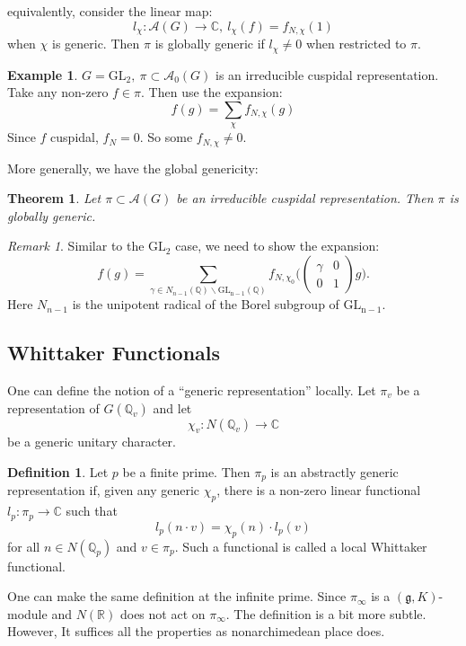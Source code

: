 \documentclass[11pt,english]{smfart}
\newtheorem{theorem}{Theorem}
\theoremstyle{definition}
\newtheorem{definition}{Definition}
\newtheorem{example}{Example}
\theoremstyle{remark}
\newtheorem*{remark}{Remark}
\begin{document}
equivalently, consider the linear map:
\[l_\chi :\mathcal{A}(G) \rightarrow \mathbb{C},\ l_\chi (f) =f_{N,\chi} (1)\]
when $\chi$ is generic. Then $\pi$ is globally generic if $l_\chi\neq 0$ when restricted to $\pi$.
\begin{example}
$G=\mathrm{GL_2},\ \pi \subset \mathcal{A}_0(G)$ is an irreducible cuspidal representation. Take any non-zero $f\in \pi$. Then use the expansion:
\[f(g) =\sum_{\chi} f_{N,\chi} (g)\]
Since $f$ cuspidal, $f_N=0.$ So some $f_{N,\chi}\neq 0.$
\end{example}
More generally, we have the global genericity:
\begin{theorem}
Let $\pi \subset \mathcal{A}(G)$ be an irreducible cuspidal representation. Then $\pi$ is globally generic.
\end{theorem}
\begin{remark}
Similar to the $\mathrm{GL_2}$ case, we need to show the expansion:
\[f(g) = \sum_{\gamma \in N_{n-1}(\mathbb{Q}) \backslash \mathrm{GL_{n-1}} (\mathbb{Q})} f_{N,\chi_0} \biggl(\left(\begin{array}{ll}
    \gamma & 0 \\
    0 & 1
    \end{array}\right)g\biggr).\]
    Here $N_{n-1}$ is the unipotent radical of the Borel
    subgroup of $\mathrm{GL_{n-1}}$.
\end{remark}
\subsection{Whittaker Functionals}
One can define the notion of a ``generic representation'' locally. Let $\pi_v$ be a representation of $G(\mathbb{Q}_v)$ and let
\[\chi_v: N(\mathbb{Q}_v) \rightarrow \mathbb{C}\]
be a generic unitary character.
\begin{definition}
Let $ p $ be a finite prime. Then $\pi_{p} $ is an abstractly generic representation if, given any generic $ \chi_{p} $,
there is a non-zero linear functional $ l_{p}: \pi_{p} \rightarrow \mathbb{C}$ such that
\[l_{p}(n \cdot v)=\chi_{p}(n) \cdot l_{p}(v)\]
for all $ n \in N\left(\mathbb{Q}_{p}\right) $ and $ v \in \pi_{p} $.
Such a functional is called a local Whittaker functional.    
\end{definition}
One can make the same definition at the infinite prime. Since $ \pi_{\infty} $ is a $ (\mathfrak{g}, K) $-module and $ N(\mathbb{R}) $ does not act on $ \pi_{\infty} $.
The definition is a bit more subtle. However, It suffices all the properties as nonarchimedean place does.
\end{document}
